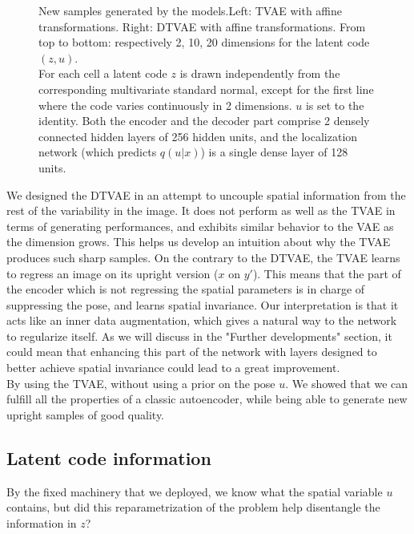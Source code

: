 \documentclass[letterpaper, twoside]{article}
\begin{document}
\begin{figure}[H]
\caption{New samples generated by the models.Left: TVAE with affine transformations. Right: DTVAE with affine transformations. From top to bottom: respectively 2, 10, 20 dimensions for the latent code $(z, u)$.\\ For each cell a latent code $z$ is drawn independently from the corresponding multivariate standard normal, except for the first line where the code varies continuously in 2 dimensions. $u$ is set to the identity. Both the encoder and the decoder part comprise 2 densely connected hidden layers of 256 hidden units, and the localization network (which predicts $q(u|x)$) is a single dense layer of 128 units.}
\label{generatedcomparison2}
\end{figure}

  We designed the DTVAE in an attempt to uncouple spatial information from the rest of the variability in the image. It does not perform as well as the TVAE in terms of generating performances, and exhibits similar behavior to the VAE as the dimension grows. This helps us develop an intuition about why the TVAE produces such sharp samples. On the contrary to the DTVAE, the TVAE learns to regress an image on its upright version ($x$ on $y'$). This means that the part of the encoder which is not regressing the spatial parameters is in charge of suppressing the pose, and learns spatial invariance. Our interpretation is that it acts like an inner data augmentation, which gives a natural way to the network to regularize itself. As we will discuss in the "Further developments" section, it could mean that enhancing this part of the network with layers designed to better achieve spatial invariance could lead to a great improvement.\\

  By using the TVAE, without using a prior on the pose $u$. We showed that we can fulfill all the properties of a classic autoencoder, while being able to generate new upright samples of good quality.

  \subsection{Latent code information}
    By the fixed machinery that we deployed, we know what the spatial variable $u$ contains, but did this reparametrization of the problem help disentangle the information in $z$?
\end{document}
